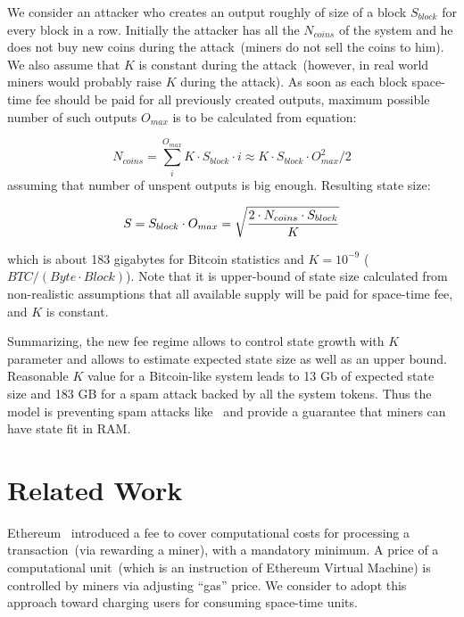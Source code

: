\documentclass[]{llncs}   %
\newcommand{\state}{state}
\begin{document}
We consider an attacker who creates an output roughly of size of a block $S_{block}$ for every block in a row. Initially the attacker has all the $N_{coins}$ of the system and he does not buy new coins during the attack~(miners do not sell the coins to him). We also assume that $K$ is constant during the attack~(however, in real world miners would probably raise $K$ during the attack). As soon as each block space-time fee should be paid for all previously created outputs, maximum possible number of such outputs $O_{max}$ is to be calculated from equation:

\begin{equation}
N_{coins} = \sum_i^{O_{max}}{K \cdot S_{block} \cdot i} \approx K \cdot S_{block} \cdot O_{max}^2 / 2
\end{equation}
assuming that number of unspent outputs is big enough. Resulting state size: 

\begin{equation}
\label{eq:statesizemax}
S = S_{block} \cdot O_{max} = \sqrt { 2 \cdot N_{coins} \cdot S_{block} \over K}
\end{equation}

which is about 183 gigabytes for Bitcoin statistics and $K=10^{-9}$ ($BTC / (Byte \cdot Block)$). %
Note that it is upper-bound of \state{} size calculated from non-realistic assumptions that all available supply will be paid for space-time fee, and $K$ is constant.

Summarizing, the new fee regime allows to control state growth with $K$ parameter and allows to estimate expected state size as well as an upper bound. Reasonable $K$ value for a Bitcoin-like system leads to 13 Gb of expected state size and 183 GB for a spam attack backed by all the system tokens. Thus the model is preventing spam attacks like~\cite{bitcoin2015flood} and provide a guarantee that miners can have state fit in RAM.

\section{Related Work}

Ethereum~\cite{ethyp} introduced a fee to cover computational costs for processing a transaction~(via rewarding a miner), with a mandatory minimum. A price of a computational unit~(which is an instruction of Ethereum Virtual Machine) is controlled by miners via adjusting ``gas'' price. We consider to adopt this approach toward charging users for consuming space-time units.
\end{document}
